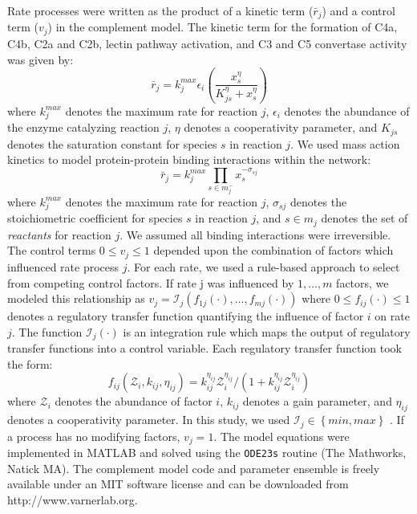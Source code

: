 \documentclass[12pt]{article}
\begin{document}
Rate processes were written as the product of a kinetic term ($\bar{r}_{j}$) and a control term ($v_{j}$) in the complement model.
The kinetic term for the formation of C4a, C4b, C2a and C2b, lectin pathway activation, and C3 and C5 convertase activity was given by:
\begin{equation}\label{eqn:rate-saturation}
	\bar{r}_{j} = k_{j}^{max}\epsilon_{i}\left(\frac{x_{s}^{\eta}}{K_{js}^{\eta} + x_{s}^{\eta}}\right)
\end{equation}
where $k_{j}^{max}$ denotes the maximum rate for reaction $j$, $\epsilon_{i}$ denotes the abundance of the enzyme catalyzing reaction $j$,
$\eta$ denotes a cooperativity parameter, and $K_{js}$ denotes the saturation constant for species $s$ in reaction $j$.
We used mass action kinetics to model protein-protein binding interactions within the network:
\begin{equation}\label{eqn:rate-action}
	\bar{r}_{j} = k_{j}^{max}\prod_{s\in{m_{j}^{-}}}x_{s}^{-\sigma_{sj}}
\end{equation}
where $k_{j}^{max}$ denotes the maximum rate for reaction $j$, $\sigma_{sj}$ denotes the stoichiometric coefficient for species $s$ in reaction $j$,
and $s\in{m_{j}}$ denotes the set of \textit{reactants} for reaction $j$. We assumed all binding interactions were irreversible.
The control terms $0\leq v_{j}\leq 1$ depended upon the combination of factors which influenced rate process $j$.
For each rate, we used a rule-based approach to select from competing control factors.
If rate j was influenced by $1,\dots,m$ factors, we modeled this relationship as
$v_{j}=\mathcal{I}_{j}\left(f_{1j}\left(\cdot\right),\hdots,f_{mj}\left(\cdot\right)\right)$
where $0\leq f_{ij}\left(\cdot\right)\leq 1$ denotes a regulatory transfer function quantifying the influence of factor $i$ on rate $j$.
The function $\mathcal{I}_{j}\left(\cdot\right)$ is an integration rule which maps the output of regulatory transfer functions into a control
variable. Each regulatory transfer function took the form:
\begin{equation}\label{eqn:control-factor}
	f_{ij}\left(\mathcal{Z}_{i},k_{ij},\eta_{ij}\right)=k_{ij}^{\eta_{ij}}\mathcal{Z}_{i}^{\eta_{ij}}/\left({1 + k_{ij}^{\eta_{ij}}\mathcal{Z}_{i}^{\eta_{ij}}}\right)
\end{equation}where $\mathcal{Z}_{i}$ denotes the abundance of factor $i$, $k_{ij}$ denotes a gain parameter, and $\eta_{ij}$ denotes a cooperativity parameter.
In this study, we used $\mathcal{I}_{j}\in\left\{min,max\right\}$ \cite{pr3010178}. If a process has no modifying factors, $v_{j}=1$.
The model equations were implemented in MATLAB and solved using the \texttt{ODE23s} routine (The Mathworks, Natick MA).
The complement model code and parameter ensemble is freely available under an MIT software license and can be downloaded from http://www.varnerlab.org.
\end{document}
